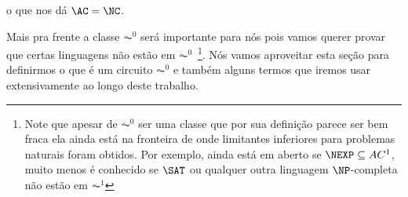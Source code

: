 o que nos dá $\AC = \NC$.

Mais pra frente a classe $\AC^{0}$ será importante para nós pois vamos querer provar que certas linguagens não estão em $\AC^{0}$~\footnote{Note que apesar de $\AC^{0}$ ser uma classe que por sua definição parece ser bem fraca ela ainda está na fronteira de onde limitantes inferiores para problemas naturais foram obtidos. Por exemplo, ainda está em aberto se $\NEXP \subseteq AC^{1}$, muito menos é conhecido se $\SAT$ ou qualquer outra linguagem $\NP$-completa não estão em $\AC^{1}$}. Nós vamos aproveitar esta seção para definirmos o que é um circuito $\AC^{0}$ e também alguns termos que iremos usar extensivamente ao longo deste trabalho.